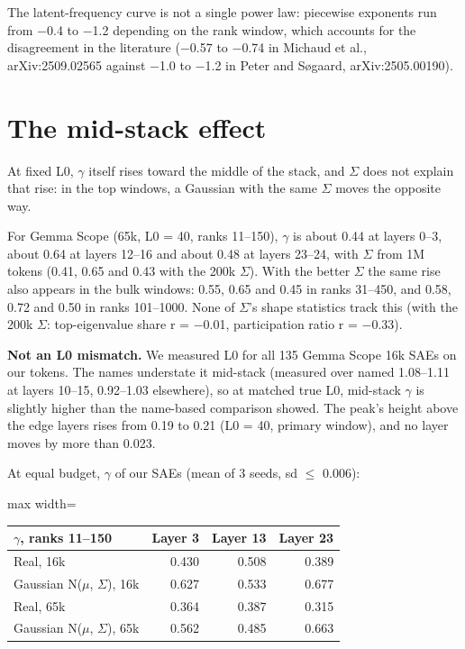 \documentclass[11pt]{article}
\begin{document}
The latent-frequency curve is not a single power law: piecewise exponents run from $-$0.4 to $-$1.2 depending on the rank window, which accounts for the disagreement in the literature ($-$0.57 to $-$0.74 in Michaud et al., arXiv:2509.02565 against $-$1.0 to $-$1.2 in Peter and Søgaard, arXiv:2505.00190).

\section{The mid-stack effect}

At fixed L0, $\gamma$ itself rises toward the middle of the stack, and $\Sigma$ does not explain that rise: in the top windows, a Gaussian with the same $\Sigma$ moves the opposite way.

For Gemma Scope (65k, L0 = 40, ranks 11--150), $\gamma$ is about 0.44 at layers 0--3, about 0.64 at layers 12--16 and about 0.48 at layers 23--24, with $\Sigma$ from 1M tokens (0.41, 0.65 and 0.43 with the 200k $\Sigma$). With the better $\Sigma$ the same rise also appears in the bulk windows: 0.55, 0.65 and 0.45 in ranks 31--450, and 0.58, 0.72 and 0.50 in ranks 101--1000. None of $\Sigma$'s shape statistics track this (with the 200k $\Sigma$: top-eigenvalue share r = $-$0.01, participation ratio r = $-$0.33).

\textbf{Not an L0 mismatch.} We measured L0 for all 135 Gemma Scope 16k SAEs on our tokens. The names understate it mid-stack (measured over named 1.08--1.11 at layers 10--15, 0.92--1.03 elsewhere), so at matched true L0, mid-stack $\gamma$ is slightly higher than the name-based comparison showed. The peak's height above the edge layers rises from 0.19 to 0.21 (L0 = 40, primary window), and no layer moves by more than 0.023.

At equal budget, $\gamma$ of our SAEs (mean of 3 seeds, sd $\le$ 0.006):

\begin{center}
\begin{adjustbox}{max width=\textwidth}
\small
\begin{tabular}{lrrr}
\toprule
\textbf{$\gamma$, ranks 11--150} & \textbf{Layer 3} & \textbf{Layer 13} & \textbf{Layer 23} \\
\midrule
Real, 16k & 0.430 & 0.508 & 0.389 \\
Gaussian N($\mu$, $\Sigma$), 16k & 0.627 & 0.533 & 0.677 \\
Real, 65k & 0.364 & 0.387 & 0.315 \\
Gaussian N($\mu$, $\Sigma$), 65k & 0.562 & 0.485 & 0.663 \\
\bottomrule
\end{tabular}
\end{adjustbox}
\end{center}
\end{document}
